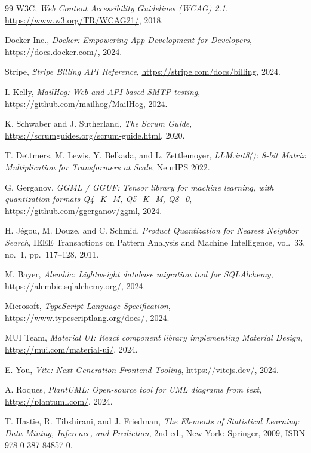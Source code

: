 \documentclass[12pt, a4paper, oneside]{report}
\begin{document}
\begin{thebibliography}{99}
W3C,
\textit{Web Content Accessibility Guidelines (WCAG) 2.1},
\url{https://www.w3.org/TR/WCAG21/}, 2018.

Docker Inc.,
\textit{Docker: Empowering App Development for Developers},
\url{https://docs.docker.com/}, 2024.

Stripe,
\textit{Stripe Billing API Reference},
\url{https://stripe.com/docs/billing}, 2024.

I. Kelly,
\textit{MailHog: Web and API based SMTP testing},
\url{https://github.com/mailhog/MailHog}, 2024.

K. Schwaber and J. Sutherland,
\textit{The Scrum Guide},
\url{https://scrumguides.org/scrum-guide.html}, 2020.

T. Dettmers, M. Lewis, Y. Belkada, and L. Zettlemoyer,
\textit{LLM.int8(): 8-bit Matrix Multiplication for Transformers at
Scale}, NeurIPS 2022.

G. Gerganov,
\textit{GGML / GGUF: Tensor library for machine learning, with
quantization formats Q4\_K\_M, Q5\_K\_M, Q8\_0},
\url{https://github.com/ggerganov/ggml}, 2024.

H. J{\'e}gou, M. Douze, and C. Schmid,
\textit{Product Quantization for Nearest Neighbor Search},
IEEE Transactions on Pattern Analysis and Machine Intelligence,
vol.~33, no.~1, pp.~117--128, 2011.

M. Bayer,
\textit{Alembic: Lightweight database migration tool for SQLAlchemy},
\url{https://alembic.sqlalchemy.org/}, 2024.

Microsoft,
\textit{TypeScript Language Specification},
\url{https://www.typescriptlang.org/docs/}, 2024.

MUI Team,
\textit{Material UI: React component library implementing Material
Design},
\url{https://mui.com/material-ui/}, 2024.

E. You,
\textit{Vite: Next Generation Frontend Tooling},
\url{https://vitejs.dev/}, 2024.

A. Roques,
\textit{PlantUML: Open-source tool for UML diagrams from text},
\url{https://plantuml.com/}, 2024.


T. Hastie, R. Tibshirani, and J. Friedman,
\textit{The Elements of Statistical Learning: Data Mining, Inference,
and Prediction}, 2nd ed., New York: Springer, 2009, ISBN 978-0-387-84857-0.


\end{thebibliography}
\end{document}
